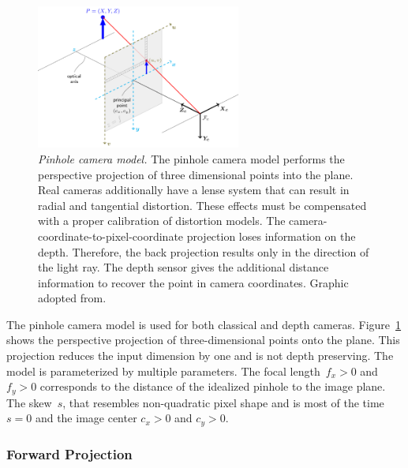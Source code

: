 \begin{figure}[htb]
    \includegraphics[width=0.6\textwidth]{chapter03/img/pinhole_camera_model.png}
    \caption[Pinhole camera model]{\emph{Pinhole camera model.} The pinhole camera model performs the perspective projection of three dimensional points into the plane. Real cameras additionally have a lense system that can result in radial and tangential distortion. These effects must be compensated with a proper calibration of distortion models. The camera-coordinate-to-pixel-coordinate projection loses information on the depth. Therefore, the back projection results only in the direction of the light ray. The depth sensor gives the additional distance information to recover the point in camera coordinates. Graphic adopted from\cite{opencv_pinhole}.}\label{fig:pinhole_model}
\end{figure}
The pinhole camera model is used for both classical and depth cameras.
Figure~\ref{fig:pinhole_model} shows the perspective projection of three-dimensional points onto the plane\cite[p. 25-35]{hartley_2004}.
This projection reduces the input dimension by one and is not depth preserving.
The model is parameterized by multiple parameters.
The focal length~$f_x > 0$ and $f_y > 0$ corresponds to the distance of the idealized pinhole to the image plane.
The skew~$s$, that resembles non-quadratic pixel shape and is most of the time $s = 0$ and the image center $c_x > 0$ and $c_y > 0$.

\subsubsection*{Forward Projection}

